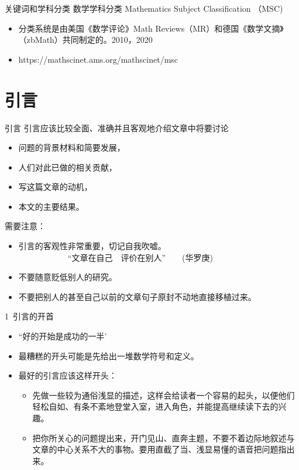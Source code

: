 \documentclass[13pt]{ctexbeamer}
\begin{document}
\begin{frame}{关键词和学科分类}
	数学学科分类 Mathematics Subject Classification  （MSC)
	\begin{itemize}
		
		\item 分类系统是由美国《数学评论》Math Reviews（MR）和德国《数学文摘》（zbMath）共同制定的。2010，2020
		
		\item https://mathscinet.ams.org/mathscinet/msc
	\end{itemize}
\end{frame}


\section{引言}
\begin{frame}{引言}
	引言应该比较全面、准确并且客观地介绍文章中将要讨论
	\begin{itemize}
		\item 问题的背景材料和简要发展，
		\item 人们对此已做的相关贡献，
		\item 写这篇文章的动机，
		\item 本文的主要结果。
	\end{itemize}
需要注意：
	\begin{itemize}
	\item 引言的客观性非常重要，切记自我吹嘘。\\
	~~~~~~~~~~~~``文章在自己~~评价在别人''~~~~(华罗庚)
	\item 不要随意贬低别人的研究。
	\item 不要把别人的甚至自己以前的文章句子原封不动地直接移植过来。
\end{itemize}
\end{frame}

\begin{frame}{1~引言的开首}
		\begin{itemize}
		\item ``好的开始是成功的一半'

		\item 最糟糕的开头可能是先给出一堆数学符号和定义。

		\item  最好的引言应该这样开头：
	\begin{itemize}
		\item 先做一些较为通俗浅显的描述，这样会给读者一个容易的起头，以便他们轻松自如、有条不紊地登堂入室，进入角色，并能提高继续读下去的兴趣。
		\item  把你所关心的问题提出来，开门见山、直奔主题，不要不着边际地叙述与文章的中心关系不大的事物。要用直截了当、浅显易懂的语音把问题指出来。
	\end{itemize}
	\end{itemize}
\end{frame}
\end{document}

